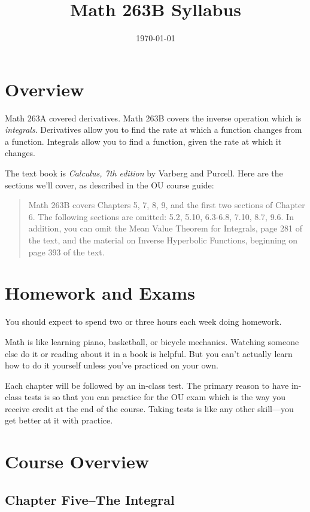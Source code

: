 \documentclass[fleqn, onecolumn]{article}
\title{Math 263B Syllabus}
\date{\today}
\begin{document}
\maketitle

\section{Overview}
Math 263A covered derivatives.  Math 263B covers the inverse operation which is {\em integrals}. Derivatives allow you
to find the rate at which a function changes from a function.  Integrals allow you to find a function, given the rate at
which it changes.


The text book is {\em Calculus, 7th edition} by Varberg and Purcell.  Here are the sections we'll cover, as described in
the OU course guide:

\begin{quote}
Math 263B covers Chapters 5, 7, 8, 9, and the first two sections of Chapter 6. The following sections are omitted: 5.2,
5.10, 6.3-6.8, 7.10, 8.7, 9.6. In addition, you can omit the Mean Value Theorem for Integrals, page 281
of the text, and the material on Inverse Hyperbolic Functions, beginning on page 393 of the text.
\end{quote}

\section{Homework and Exams}

You should expect to spend two or three hours each week doing homework.

Math is like learning piano, basketball, or bicycle mechanics.  Watching someone else do it or reading about it in a
book is helpful.  But you can't actually learn how to do it yourself unless you've practiced on your own.

Each chapter will be followed by an in-class test.  The primary reason to have in-class tests is so that you can
practice for the OU exam which is the way you receive credit at the end of the course.  Taking tests is like any other
skill---you get better at it with practice.

\section{Course Overview}

\subsection{Chapter Five--The Integral}
\end{document}
